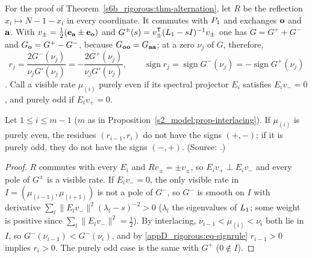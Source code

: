 For the proof of Theorem~\ref{s6b_rigorous:thm-alternation}, let $R$ be the reflection $x_i\mapsto N-1-x_i$ in every
coordinate. It commutes with $P_1$ and exchanges $\mathbf{o}$ and $\mathbf{a}$. With $v_\pm=\frac12(\mathbf{e}_{\mathbf{a}}\pm\mathbf{e}_{\mathbf{o}})$ and
$G^{\pm}(s)=v_\pm^{\mathsf{T}}(L_1-sI)^{-1}v_\pm$ one has $G=G^{+}+G^{-}$ and $G_{\mathbf{o}}=G^{+}-G^{-}$, because
$G_{\mathbf{o}\mathbf{o}}=G_{\mathbf{a}\mathbf{a}}$; at a zero $\nu_j$ of $G$, therefore,
\begin{equation}\label{appD_rigorous:eq-signrule}
r_j=\frac{2G^{-}(\nu_j)}{\nu_jG'(\nu_j)}=-\frac{2G^{+}(\nu_j)}{\nu_jG'(\nu_j)},\qquad
\operatorname{sign}r_j=\operatorname{sign}G^{-}(\nu_j)=-\operatorname{sign}G^{+}(\nu_j)
\end{equation}
. Call a visible rate $\mu_{(i)}$ purely even if its spectral projector $E_i$ satisfies
$E_iv_-=0$, and purely odd if $E_iv_+=0$.

\begin{lemma}\label{appD_rigorous:lem-parity}
 Let $1\le i\le m-1$ ($m$ as in Proposition~\ref{s2_model:prop-interlacing}). If $\mu_{(i)}$ is purely even,
the residues $(r_{i-1},r_i)$ do not have the signs $(+,-)$; if it is purely odd, they do not have the signs $(-,+)$.
\textup{(Source: .)}
\end{lemma}

\begin{proof}
$R$ commutes with every $E_i$ and $Rv_\pm=\pm v_\pm$, so $E_iv_+\perp E_iv_-$ and every pole of $G^{\pm}$ is a visible
rate. If $E_iv_-=0$, the only visible rate in $I=(\mu_{(i-1)},\mu_{(i+1)})$ is not a pole of $G^{-}$, so $G^{-}$ is
smooth on $I$ with derivative $\sum_l\|E_lv_-\|^{2}(\lambda_l-s)^{-2}>0$ ($\lambda_l$ the eigenvalues of $L_1$; some
weight is positive since $\sum_l\|E_lv_-\|^{2}=\frac12$). By interlacing, $\nu_{i-1}<\mu_{(i)}<\nu_i$ both lie in
$I$, so $G^{-}(\nu_{i-1})<G^{-}(\nu_i)$, and by \eqref{appD_rigorous:eq-signrule} $r_{i-1}>0$ implies $r_i>0$. The
purely odd case is the same with $G^{+}$ ($0\notin I$).
\end{proof}

